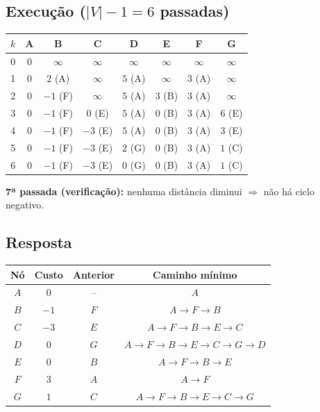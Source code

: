 \documentclass[11pt, a4paper]{article}
\begin{document}
\subsection*{Execução ($|V|-1 = 6$ passadas)}
\begin{center}
\begin{tabular}{cccccccc}
\toprule
\textbf{$k$} & \textbf{A} & \textbf{B} & \textbf{C} & \textbf{D} & \textbf{E} & \textbf{F} & \textbf{G} \\
\midrule
0 & $0$ & $\infty$ & $\infty$ & $\infty$ & $\infty$ & $\infty$ & $\infty$ \\
1 & $0$ & $2$ (A) & $\infty$ & $5$ (A) & $\infty$ & $3$ (A) & $\infty$ \\
2 & $0$ & $-1$ (F) & $\infty$ & $5$ (A) & $3$ (B) & $3$ (A) & $\infty$ \\
3 & $0$ & $-1$ (F) & $0$ (E) & $5$ (A) & $0$ (B) & $3$ (A) & $6$ (E) \\
4 & $0$ & $-1$ (F) & $-3$ (E) & $5$ (A) & $0$ (B) & $3$ (A) & $3$ (E) \\
5 & $0$ & $-1$ (F) & $-3$ (E) & $2$ (G) & $0$ (B) & $3$ (A) & $1$ (C) \\
6 & $0$ & $-1$ (F) & $-3$ (E) & $0$ (G) & $0$ (B) & $3$ (A) & $1$ (C) \\
\bottomrule
\end{tabular}
\smallskip

\end{center}

\noindent\textbf{7ª passada (verificação):} nenhuma distância diminui $\Rightarrow$ não há ciclo negativo.

\subsection*{Resposta}
\begin{center}
\begin{tabular}{cccc}
\toprule
\textbf{Nó} & \textbf{Custo} & \textbf{Anterior} & \textbf{Caminho mínimo} \\
\midrule
$A$ & $0$ & -- & $A$ \\
$B$ & $-1$ & $F$ & $A \to F \to B$ \\
$C$ & $-3$ & $E$ & $A \to F \to B \to E \to C$ \\
$D$ & $0$ & $G$ & $A \to F \to B \to E \to C \to G \to D$ \\
$E$ & $0$ & $B$ & $A \to F \to B \to E$ \\
$F$ & $3$ & $A$ & $A \to F$ \\
$G$ & $1$ & $C$ & $A \to F \to B \to E \to C \to G$ \\
\bottomrule
\end{tabular}
\end{center}
\end{document}
